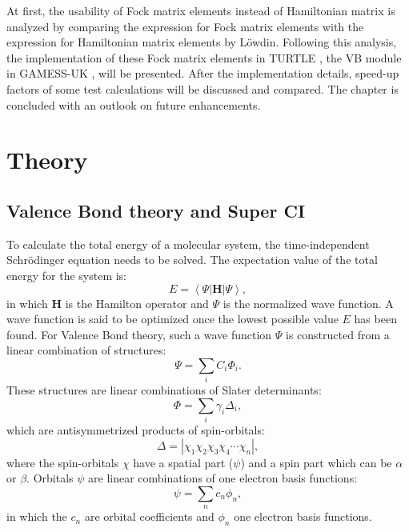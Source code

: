 At first, the usability of Fock matrix elements instead of Hamiltonian matrix is analyzed by comparing the expression for Fock matrix elements with the expression for Hamiltonian matrix elements by L\"{o}wdin. Following this analysis, the implementation of these Fock matrix elements in TURTLE \cite{turtle}, the VB module in GAMESS-UK \cite{gamess}, will be presented. After the implementation details, speed-up factors of some test calculations will be discussed and compared. The chapter is concluded with an outlook on future enhancements.  

\section{Theory}

\subsection{\label{ch2.sec.vbsci}Valence Bond theory and Super CI}

To calculate the total energy of a molecular system, the time-independent Schr\"{o}dinger equation needs to be solved. The expectation value of the total energy for the system is:
\begin{equation}
E = \left< \Psi | \mathbf{H} | \Psi \right>,
\end{equation}
in which $\mathbf{H}$ is the Hamilton operator and $\Psi$ is the normalized wave function. A wave function is said to be optimized once the lowest possible value $E$ has been found. For Valence Bond theory, such a wave function $\Psi$ is constructed from a linear combination of structures:
\begin{equation}
\Psi = \sum_{i} C_i \Phi_i.
\label{ch2.eq.vbwf}
\end{equation}
These structures are linear combinations of Slater determinants:
\begin{equation}
\Phi = \sum_{i} \gamma_i \Delta_i,
\label{ch2.eq.struct}
\end{equation}
which are antisymmetrized products of spin-orbitals:
\begin{equation}
\Delta = |\chi_1\chi_2\chi_3\chi_4 \cdots \chi_n|,
\label{ch2.eq.determ}
\end{equation}
where the spin-orbitals $\chi$ have a spatial part ($\psi$) and a spin part which can be $\alpha$ or $\beta$. 
Orbitals $\psi$ are linear combinations of one electron basis functions:
\begin{equation}
\psi = \sum_{n} c_n \phi_n,
\label{ch2.eq.basis}
\end{equation}
in which the $c_n$ are orbital coefficients and $\phi_n$ one electron basis functions.

